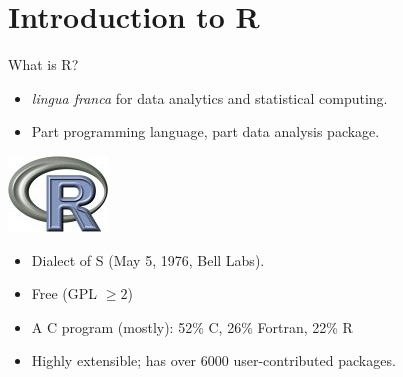 \section{Introduction to R}

\begin{frame}
  \begin{block}{What is R?}\pause
  \begin{minipage}{.675\textwidth}
  \begin{itemize}[<+-|alert@+>]
    \item \emph{lingua franca} for data analytics and statistical computing.
    \item Part programming language, part data analysis package.
  \end{itemize}
  \end{minipage}
  \hfill
  \begin{minipage}{.3\textwidth}
    \centering\includegraphics[scale=.85]{../common/pics/Rlogo}
  \end{minipage}
  \begin{itemize}
    \item Dialect of S (May 5, 1976, Bell Labs).
    \item Free (GPL $\geq 2$)
    \item A C program (mostly): 52\% C, 26\% Fortran, 22\% R
    \item Highly extensible; has over 6000 user-contributed packages.
  \end{itemize}
\end{block}
\end{frame}



